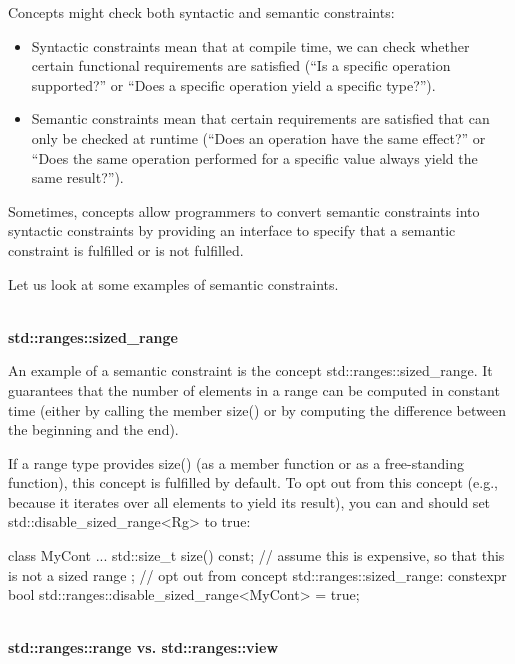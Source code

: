 
Concepts might check both syntactic and semantic constraints:

\begin{itemize}
\item
Syntactic constraints mean that at compile time, we can check whether certain functional requirements are satisfied (“Is a specific operation supported?” or “Does a specific operation yield a specific type?”).

\item
Semantic constraints mean that certain requirements are satisfied that can only be checked at runtime (“Does an operation have the same effect?” or “Does the same operation performed for a specific value always yield the same result?”).
\end{itemize}

Sometimes, concepts allow programmers to convert semantic constraints into syntactic constraints by providing an interface to specify that a semantic constraint is fulfilled or is not fulfilled.


Let us look at some examples of semantic constraints.

\noindent
\hspace*{\fill} \\ %
\textbf{std::ranges::sized\_range}

An example of a semantic constraint is the concept std::ranges::sized\_range. It guarantees that the number of elements in a range can be computed in constant time (either by calling the member size() or by computing the difference between the beginning and the end).

If a range type provides size() (as a member function or as a free-standing function), this concept is fulfilled by default. To opt out from this concept (e.g., because it iterates over all elements to yield its result), you can and should set std::disable\_sized\_range<Rg> to true:

\begin{cpp}
class MyCont {
	...
	std::size_t size() const; // assume this is expensive, so that this is not a sized range
};
// opt out from concept std::ranges::sized_range:
constexpr bool std::ranges::disable_sized_range<MyCont> = true;
\end{cpp}

\noindent
\hspace*{\fill} \\ %
\textbf{std::ranges::range vs. std::ranges::view}


